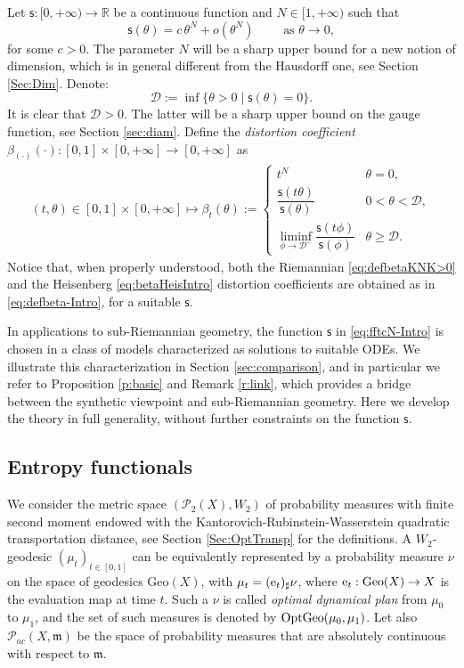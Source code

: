 \documentclass[11pt,a4paper]{article}
\theoremstyle{plain}
\theoremstyle{definition}
\theoremstyle{remark}
\numberwithin{equation}{section}
\newcommand{\R}{\mathbb{R}} %
\newcommand{\Geo}{\mathrm{Geo}}
\newcommand{\OptGeo}{{\rm OptGeo}}
\newcommand{\cD}{\mathcal{D}}
\newcommand{\sfs}{\mathsf{s}}
\newcommand{\Prob}{\mathcal{P}}
\newcommand{\mm}{\mathfrak m}
\newcommand{\ee}{{\rm e}}
\begin{document}
Let $\sfs:[0,+\infty)\to \R$ be a continuous function and $N\in [1,+\infty)$ such that
\begin{equation}\label{eq:fftcN-Intro}
\sfs(\theta)=c \, \theta^{N}+o(\theta^{N}) \qquad \text{ as $\theta\to 0$},
\end{equation}
for some $c >0$. The parameter $N$ will be a sharp upper bound for a new notion of dimension, which is in general different from the Hausdorff one, see Section \ref{Sec:Dim}. 
Denote:
\begin{equation}\label{eq:defcD-Intro}
\cD:=\inf\{\theta>0\mid \sfs(\theta)=0\}.
\end{equation}  
It is clear that $\cD>0$. The latter will be a sharp upper bound on the gauge function, see Section \ref{sec:diam}.
 Define the \emph{distortion coefficient} $\beta_{(\cdot)}(\cdot):[0,1]\times [0,+\infty]\to [0,+\infty]$ as
\begin{align}\label{eq:defbeta-Intro}
 (t,\theta)\in [0,1]\times [0,+\infty]\mapsto \beta_{t}(\theta):=
 \begin{cases}
 t^{N} &\theta =0, \\
\dfrac{\sfs(t\theta )}{\sfs(\theta)}& 0<\theta <\cD,\\
 \displaystyle  \liminf_{\phi \to \cD^-} \dfrac{\sfs(t\phi )}{\sfs(\phi)} & \theta \geq \cD.\end{cases}
\end{align}
Notice that, when properly understood,  both the Riemannian  \eqref{eq:defbetaKNK>0} and  the Heisenberg  \eqref{eq:betaHeisIntro}  distortion coefficients  are obtained as in \eqref{eq:defbeta-Intro}, for a suitable $\sfs$.

\medskip
In applications to sub-Riemannian geometry, the function  $\sfs$ in \eqref{eq:fftcN-Intro} is chosen in a class of models characterized as solutions to suitable ODEs. We illustrate this characterization in Section \ref{sec:comparison}, and in particular we refer to Proposition \ref{p:basic} and Remark \ref{r:link}, which provides a bridge between the synthetic viewpoint and sub-Riemannian geometry. Here we develop the theory in full generality, without further constraints on the function $\sfs$.


\subsection*{Entropy functionals}
We consider the metric space  $(\mathcal{P}_{2}(X), W_2)$ of probability measures with finite second moment endowed with the  Kantorovich-Rubinstein-Wasserstein  quadratic transportation distance, see Section \ref{Sec:OptTransp} for the definitions.
A $W_2$-geodesic $(\mu_t)_{t\in [0,1]}$ can be equivalently represented by a probability measure  $\nu$ on the space of geodesics $\Geo(X)$, with $\mu_t=(\ee_t)_{\sharp} \nu$, where $\ee_t:\Geo(X)\to X$ is the evaluation map at time $t$. Such a $\nu$ is called \emph{optimal dynamical plan} from $\mu_0$ to $\mu_1$, and the set of such measures is denoted by $\OptGeo(\mu_0, \mu_1)$.  Let also $\Prob_{ac}(X,\mm)$ be the space of probability measures that are absolutely continuous with respect to $\mm$.
\end{document}

